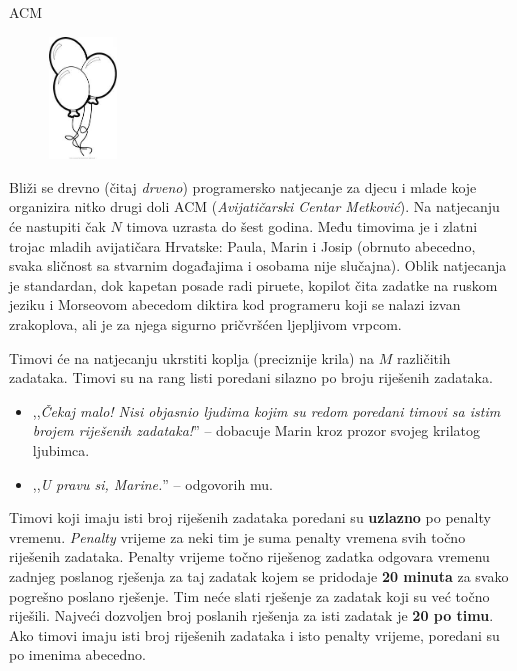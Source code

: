 \begin{statement}[
  problempoints=50,
  timelimit=1 sekunda,
  memorylimit=512 MiB,
]{ACM}

\setlength\intextsep{-0.1cm}
\begin{figure}
\centering
\includegraphics[width=0.16\textwidth]{img/balloon.jpeg}
\end{figure}

Bliži se drevno (čitaj \textit{drveno}) programersko natjecanje za djecu i
mlade koje organizira nitko drugi doli ACM (\textit{Avijatičarski Centar Metković}).
Na natjecanju će nastupiti čak $N$ timova uzrasta do šest godina. Među timovima
je i zlatni trojac mladih avijatičara Hrvatske: Paula, Marin i Josip (obrnuto
abecedno, svaka sličnost sa stvarnim događajima i osobama nije slučajna).
Oblik natjecanja je standardan, dok kapetan posade radi piruete, kopilot čita
zadatke na ruskom jeziku i Morseovom abecedom diktira kod programeru koji se
nalazi izvan zrakoplova, ali je za njega sigurno pričvršćen ljepljivom vrpcom.

Timovi će na natjecanju ukrstiti koplja (preciznije krila) na $M$ različitih
zadataka. Timovi su na rang listi poredani silazno po broju riješenih
zadataka.

\begin{itemize}[topsep=0pt]
\item ,,\textit{Čekaj malo! Nisi objasnio ljudima kojim su redom poredani
timovi sa istim brojem riješenih zadataka!}'' -- dobacuje Marin kroz prozor
svojeg krilatog ljubimca.
\item ,,\textit{U pravu si, Marine.}'' -- odgovorih mu.
\end{itemize}

Timovi koji imaju isti broj riješenih zadataka poredani su \textbf{uzlazno} po
penalty vremenu. \textit{Penalty} vrijeme za neki tim je suma penalty vremena
svih točno riješenih zadataka. Penalty vrijeme točno riješenog zadatka
odgovara vremenu zadnjeg poslanog rješenja za taj zadatak kojem se pridodaje
\textbf{20 minuta} za svako pogrešno poslano rješenje.  Tim neće slati
rješenje za zadatak koji su već točno riješili. Najveći dozvoljen broj
poslanih rješenja za isti zadatak je \textbf{20 po timu}. Ako timovi imaju
isti broj riješenih zadataka i isto penalty vrijeme, poredani su po imenima
abecedno.


\end{statement}
